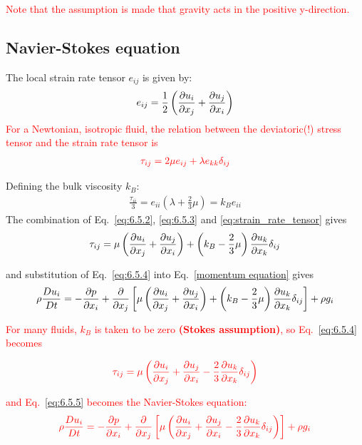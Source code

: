 \documentclass[document.tex]{subfiles}
\begin{document}
\textcolor{red}{Note that the assumption is made that gravity acts in the positive y-direction.}

\subsection{Navier-Stokes equation}
The local strain rate tensor $e_{ij}$ is given by: 
\begin{align} \label{eq:strain_rate_tensor}
    e_{ij} = \frac{1}{2}\left(\pdv{u_i}{x_j}+\pdv{u_j}{x_i}\right)
\end{align}
\textcolor{red}{For a Newtonian, isotropic fluid, the relation between the deviatoric(!) 
stress tensor and the strain rate tensor is}
\begin{align} \label{eq:6.5.2}
    \color{red}
    \tau_{ij} = 2\mu e_{ij} + \lambda e_{kk} \delta_{ij}
\end{align}

Defining the bulk viscosity $k_B$: 
\begin{align} \label{eq:6.5.3}
    \frac{\tau_{ii}}{3} = e_{ii}\left(\lambda +\frac{2}{3}\mu\right) = k_Be_{ii}
\end{align}
The combination of Eq.~\eqref{eq:6.5.2}, \eqref{eq:6.5.3} and \eqref{eq:strain_rate_tensor} gives
\begin{align} \label{eq:6.5.4}
    \tau_{ij} = \mu \left(\pdv{u_i}{x_j}+\pdv{u_j}{x_i}\right) + \left(k_B - \frac{2}{3} \mu \right)\pdv{u_k}{x_k}\delta_{ij}
\end{align}

and substitution of Eq.~\eqref{eq:6.5.4} into Eq.~\ref{momentum equation} gives
\begin{align} \label{eq:6.5.5}
    \rho \frac{D u_i}{D t} = - \pdv{p}{x_i} + \pdv{x_j}\left[\mu \left(\pdv{u_i}{x_j}+\pdv{u_j}{x_i}\right) + 
    \left(k_B - \frac{2}{3} \mu \right)\pdv{u_k}{x_k}\delta_{ij}\right] + \rho g_i
\end{align}

\textcolor{red}{For many fluids, $k_B$ is taken to be zero \textbf{(Stokes assumption)}, 
so Eq.~\eqref{eq:6.5.4} becomes} 

\begin{align} \label{eq:6.5.6}
    \color{red}
     \tau_{ij} = \mu \left(\pdv{u_i}{x_j}+\pdv{u_j}{x_i} - \frac{2}{3}\pdv{u_k}{x_k}\delta_{ij}\right)
\end{align}

\textcolor{red}{and Eq.~\eqref{eq:6.5.5} becomes the Navier-Stokes equation:}
\begin{align} \label{eq:6.5.7}
    \color{red}
    \rho \frac{D u_i}{D t} = - \pdv{p}{x_i} + \pdv{x_j}\left[\mu \left(\pdv{u_i}{x_j}
    +\pdv{u_j}{x_i}-\frac{2}{3}\pdv{u_k}{x_k}\delta_{ij}\right)\right]
    + \rho g_i
\end{align}
\end{document}
